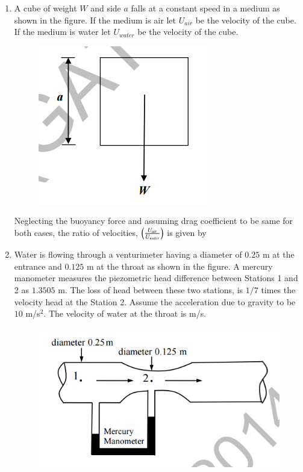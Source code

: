 \documentclass[a4paper,10pt]{article}
\begin{document}
\begin{enumerate}
    \item A cube of weight $W$ and side $a$ falls at a constant speed in a medium as shown in the figure. If the medium is air  let $U_{air}$ be the velocity of the cube. If the medium is water  let $U_{water}$ be the velocity of the cube.
    \begin{figure}[H] \centering \includegraphics[width=0.3\columnwidth]{Bq21.png} \caption*{} \label{fig:q21_fluid} \end{figure}
    Neglecting the buoyancy force and assuming drag coefficient to be same for both cases, the ratio of velocities, $\left(\frac{U_{air}}{U_{water}}\right)$ is given by
    
    \hfill{}
    \begin{enumerate}[label=\Alph*)]
    \end{enumerate}

    \item Water is flowing through a venturimeter having a diameter of $0.25$ m at the entrance  and $0.125$ m at the throat  as shown in the figure. A mercury manometer measures the piezometric head difference between Stations 1 and 2 as $1.3505$ m. The loss of head between these two stations, is $1/7$ times the velocity head at the Station 2. Assume the acceleration due to gravity to be $10$ m/s$^2$. The velocity of water at the throat is \underline{\hspace{2cm}} m/s.
    \begin{figure}[H] \centering \includegraphics[width=0.6\columnwidth]{Bq22.png} \caption*{} \label{fig:q22_fluid} \end{figure}
    
    \hfill{}
\end{enumerate}
\clearpage
\end{document}
